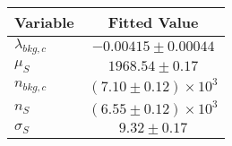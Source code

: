 \begin{tabular}[t]{lc}
\hline
Variable &Fitted Value\\
\hline\hline
$\lambda_{bkg,c}$&$-0.00415\pm0.00044$\\
\hline
$\mu_{S}$&$1968.54\pm0.17$\\
\hline
$n_{bkg,c}$&$(7.10\pm0.12)\times 10^3$\\
\hline
$n_{S}$&$(6.55\pm0.12)\times 10^3$\\
\hline
$\sigma_{S}$&$9.32\pm0.17$\\
\hline
\end{tabular}
